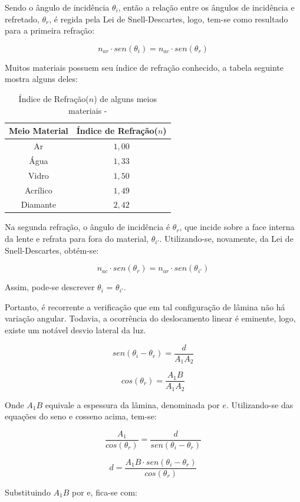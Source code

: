 \documentclass[
	12pt,				%
	oneside,			%
	a4paper,			%
	english,			%
	french,				%
	spanish,			%
	brazil				%
	]{abntex2}
\begin{document}
Sendo o ângulo de incidência $\theta_i$, então a relação entre os ângulos de incidência e refretado, $\theta_r$, é regida pela Lei de Snell-Descartes, logo, tem-se como resultado para a primeira refração:

$$n_{ar} \cdot sen(\theta_i) = n_{ac} \cdot sen(\theta_r)$$

Muitos materiais possuem seu índice de refração conhecido, a tabela seguinte mostra alguns deles:

\begin{table}[htb]
	\centering
	\begin{tabular}{c|c}
		\hline		
		Meio Material & Índice de Refração($n$) \\
		\hline
		Ar & $1,00$ \\
		Água & $1,33$ \\
		Vidro & $1,50$ \\
		Acrílico & $1,49$ \\
		Diamante & $2,42$ \\
		\hline
	\end{tabular}
	\caption{Índice de Refração($n$) de alguns meios materiais - \cite{usprefrac}}
	\label{tabela-índice_n}
\end{table}

\newpage

Na segunda refração, o ângulo de incidência é $\theta_r$, que incide sobre a face interna da lente e refrata para fora do material, $\theta_{i'}$. Utilizando-se, novamente, da Lei de Snell-Descartes, obtém-se:

$$n_{ac} \cdot sen(\theta_r) = n_{ar} \cdot sen(\theta_{i'})$$

Assim, pode-se descrever $\theta_i$ = $\theta_{i'}$.

Portanto, é recorrente a verificação que em tal configuração de lâmina não há variação angular. Todavia, a ocorrência do deslocamento linear é eminente, logo, existe um notável desvio lateral da luz.

$$sen(\theta_i - \theta_r) = \dfrac{d}{A_1A_2}$$

$$cos(\theta_r) = \dfrac{A_1B}{A_1A_2}$$

Onde $A_1B$ equivale a espessura da lâmina, denominada por $e$. Utilizando-se das equações do seno e cosseno acima, tem-se:

$$\dfrac{A_1}{cos(\theta_r)} = \dfrac{d}{sen(\theta_i - \theta_r)}$$

$$d = \dfrac{A_1B \cdot sen(\theta_i - \theta_r)}{cos(\theta_r)}$$

Substituindo $A_1B$ por e, fica-se com:
\end{document}
